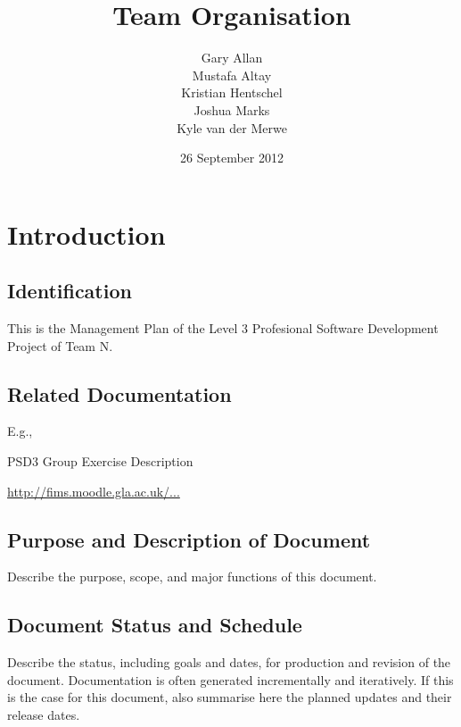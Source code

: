 \documentclass{l3deliverable}
\title{Team Organisation}
\author{
  Gary Allan\\
  Mustafa Altay\\
  Kristian Hentschel\\
  Joshua Marks\\
  Kyle van der Merwe\\
}
\date{26 September 2012}
\begin{document}

\maketitle


\section{Introduction}

\subsection{Identification}

This is the Management Plan of the Level 3 Profesional Software Development Project of Team N.

\subsection{Related Documentation}

E.g.,
\begin{list}{}{}
\item PSD3 Group Exercise Description \
  
  \url{http://fims.moodle.gla.ac.uk/...}
\end{list}
 

\subsection{Purpose and Description of Document}
Describe the purpose, scope, and major functions of this document.

\subsection{Document Status and Schedule}

Describe the status, including goals and dates, for production and
revision of the document.  Documentation is often generated
incrementally and iteratively. If this is the case for this document,
also summarise here the planned updates and their release dates.

\end{document}
